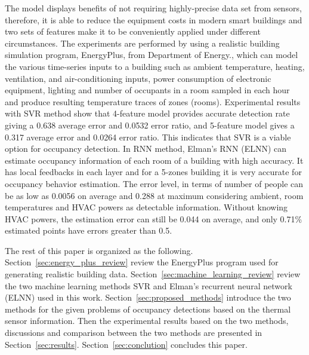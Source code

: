 The model displays benefits of not requiring highly-precise data set
from sensors, therefore, it is able to reduce the equipment costs in
modern smart buildings and two sets of features make it to be
conveniently applied under different circumstances. The experiments
are performed by using a realistic building simulation program,
EnergyPlus, from Department of Energy., which can model the various
time-series inputs to a building such as ambient temperature, heating,
ventilation, and air-conditioning inputs, power consumption of
electronic equipment, lighting and number of occupants in a room
sampled in each hour and produce resulting temperature traces of zones
(rooms).  Experimental results with SVR method show that 4-feature
model provides accurate detection rate giving a 0.638 average error
and 0.0532 error ratio, and 5-feature model gives a 0.317 average
error and 0.0264 error ratio. This indicates that SVR is a viable
option for occupancy detection.  In RNN method, Elman's RNN (ELNN) can
estimate occupancy information of each room of a building with high
accuracy. It has local feedbacks in each layer and for a 5-zones
building it is very accurate for occupancy behavior estimation. The
error level, in terms of number of people can be as low as 0.0056 on
average and 0.288 at maximum considering ambient, room temperatures
and HVAC powers as detectable information. Without knowing HVAC
powers, the estimation error can still be 0.044 on average, and only
0.71\% estimated points have errors greater than 0.5.

The rest of this paper is organized as the following.
Section~\ref{sec:energy_plus_review} review the EnergyPlus program
used for generating realistic building
data. Section~\ref{sec:machine_learning_review} review the two machine
learning methods SVR and Elman's recurrent neural network (ELNN) used
in this work.  Section~\ref{sec:proposed_methods} introduce the two
methods for the given problems of occupancy detections based on the
thermal sensor information. Then the experimental results based on the
two methods, discussions and comparison between the two methods are
presented in Section~\ref{sec:results}. Section~\ref{sec:conclution}
concludes this paper.
